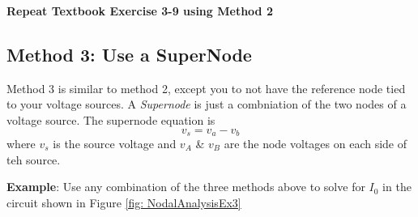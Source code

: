 \documentclass{handout}
\begin{document}
\textbf{Repeat Textbook Exercise 3-9 using Method 2}

\newpage
\pagebreak
\clearpage
\subsection{Method 3: Use a SuperNode}
Method 3 is similar to method 2, except you to not have the reference node tied to your voltage sources.  A {\em Supernode} is just a combniation of the two nodes of a voltage source.  The supernode equation is
\begin{equation}
v_s = v_a-v_b
\end{equation}
where $v_s$ is the source voltage and $v_A$ \& $v_B$ are the node voltages on each side of teh source.

\textbf{Example}: Use any combination of the three methods above to solve for $I_0$ in the circuit shown in Figure \ref{fig: NodalAnalysisEx3}
\end{document}
